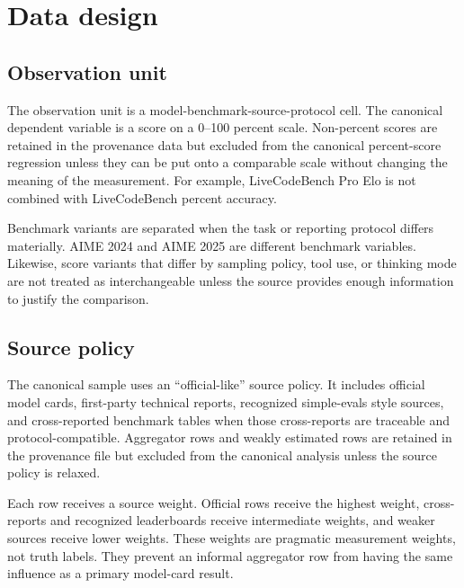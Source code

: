 \documentclass[11pt]{article}
\begin{document}
\section{Data design}
\subsection{Observation unit}
The observation unit is a model-benchmark-source-protocol cell. The canonical dependent variable is a score on a 0--100 percent scale. Non-percent scores are retained in the provenance data but excluded from the canonical percent-score regression unless they can be put onto a comparable scale without changing the meaning of the measurement. For example, LiveCodeBench Pro Elo is not combined with LiveCodeBench percent accuracy.

Benchmark variants are separated when the task or reporting protocol differs materially. AIME 2024 and AIME 2025 are different benchmark variables. Likewise, score variants that differ by sampling policy, tool use, or thinking mode are not treated as interchangeable unless the source provides enough information to justify the comparison.

\subsection{Source policy}
The canonical sample uses an ``official-like'' source policy. It includes official model cards, first-party technical reports, recognized simple-evals style sources, and cross-reported benchmark tables when those cross-reports are traceable and protocol-compatible. Aggregator rows and weakly estimated rows are retained in the provenance file but excluded from the canonical analysis unless the source policy is relaxed.

Each row receives a source weight. Official rows receive the highest weight, cross-reports and recognized leaderboards receive intermediate weights, and weaker sources receive lower weights. These weights are pragmatic measurement weights, not truth labels. They prevent an informal aggregator row from having the same influence as a primary model-card result.
\end{document}
